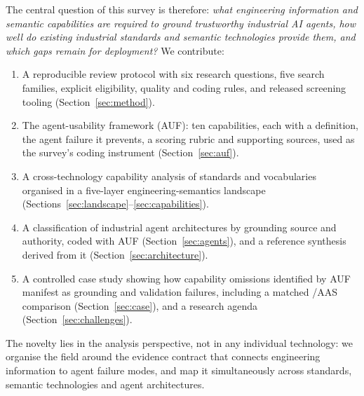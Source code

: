 The central question of this survey is therefore: \emph{what engineering information and
semantic capabilities are required to ground trustworthy industrial AI agents, how well do
existing industrial standards and semantic technologies provide them, and which gaps remain
for deployment?} We contribute:
\begin{enumerate}[label=\textbf{C\arabic*.},leftmargin=2.3em]
  \item A reproducible review protocol with six research questions, five search families,
  explicit eligibility, quality and coding rules, and released screening tooling
  (Section~\ref{sec:method}).
  \item The agent-usability framework (AUF): ten capabilities, each with a definition,
  the agent failure it prevents, a scoring rubric and supporting sources, used as the
  survey's coding instrument (Section~\ref{sec:auf}).
  \item A cross-technology capability analysis of \AufTechnologies{} standards and
  vocabularies organised in a five-layer engineering-semantics landscape
  (Sections~\ref{sec:landscape}--\ref{sec:capabilities}).
  \item A classification of industrial agent architectures by grounding source and
  authority, coded with AUF (Section~\ref{sec:agents}), and a reference synthesis
  derived from it (Section~\ref{sec:architecture}).
  \item A controlled case study showing how capability omissions identified by AUF manifest
  as grounding and validation failures, including a matched \opcua{}/AAS comparison
  (Section~\ref{sec:case}), and a research agenda (Section~\ref{sec:challenges}).
\end{enumerate}
The novelty lies in the analysis perspective, not in any individual technology: we
organise the field around the evidence contract that connects engineering information to
agent failure modes, and map it simultaneously across standards, semantic technologies and
agent architectures.
